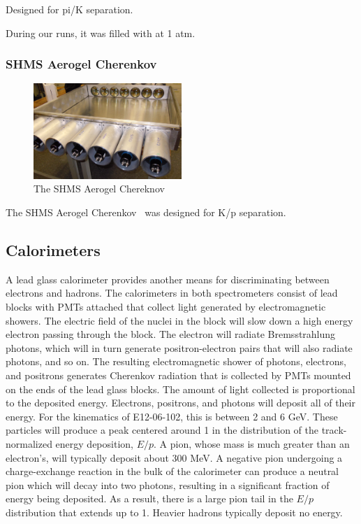 Designed for pi/K separation.

During our runs, it was filled with  at 1 atm.

\subsubsection{SHMS Aerogel Cherenkov}
\begin{figure}[ht]
    \centering
    \includegraphics[width=0.5\textwidth]{chap3/shms_aerogel_open.jpg}
    \caption{The SHMS Aerogel Chereknov }
    \label{fig:shms_aerogel}
\end{figure}

The SHMS Aerogel Cherenkov~\cite{Horn_2017} was designed for K/p separation.

\subsection{Calorimeters}
A lead glass calorimeter provides another means for discriminating between
electrons and hadrons.
The calorimeters in both spectrometers consist of lead blocks with
PMTs attached that collect light generated by electromagnetic showers.
The electric field of the nuclei in the block will slow down a high energy
electron passing through the block.
The electron will radiate Bremsstrahlung photons, which will in turn generate
positron-electron pairs that will also radiate photons, and so on.
The resulting electromagnetic shower of photons, electrons, and positrons
generates Cherenkov radiation that is collected by PMTs mounted on the ends
of the lead glass blocks.
The amount of light collected is proportional to the deposited energy.
Electrons, positrons, and photons will deposit all of their energy.
For the kinematics of E12-06-102, this is between 2 and 6 GeV.
These particles will produce a peak centered around 1 in the distribution of
the track-normalized energy deposition, $E/p$.
A pion, whose mass is much greater than an electron's, will typically deposit
about 300 MeV.
A negative pion undergoing a charge-exchange reaction in the bulk of the
calorimeter can produce a neutral pion which will decay into two photons,
resulting in a significant fraction of energy being deposited.
As a result, there is a large pion tail in the $E/p$ distribution that extends
up to 1.
Heavier hadrons typically deposit no energy.

